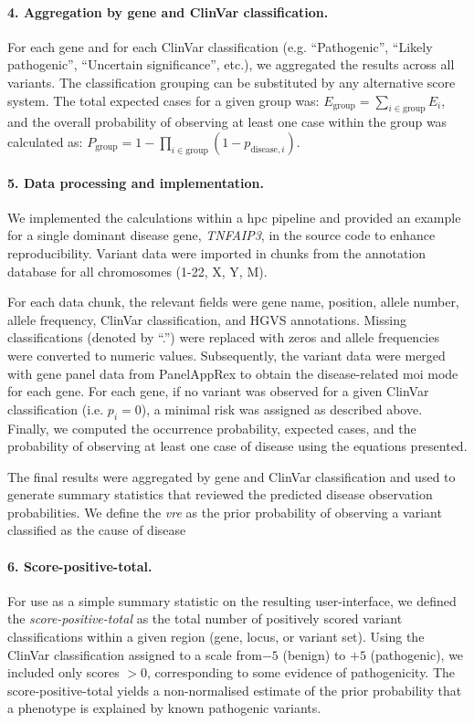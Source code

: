\paragraph{4. Aggregation by gene and ClinVar classification.}
For each gene and for each ClinVar classification (e.g. ``Pathogenic'', ``Likely pathogenic'', ``Uncertain significance'', etc.), we aggregated the results across all variants. The classification grouping can be substituted by any alternative score system. The total expected cases for a given group was:
$E_{\text{group}} = \sum_{i \in \text{group}} E_i$,
and the overall probability of observing at least one case within the group was calculated as:
$P_{\text{group}} = 1 - \prod_{i \in \text{group}} \left(1 - p_{\text{disease},i}\right)$.

\paragraph{5. Data processing and implementation.}
We implemented the calculations within a \ac{hpc} pipeline and provided an example for a single dominant disease gene, \textit{TNFAIP3}, in the source code to enhance reproducibility. Variant data were imported in chunks from the annotation database for all chromosomes (1-22, X, Y, M). 

For each data chunk, the relevant fields were gene name, position, allele number, allele frequency, ClinVar classification, and HGVS annotations. 
Missing classifications (denoted by ``.'') were replaced with zeros and allele frequencies were converted to numeric values. %
Subsequently, the variant data were merged with gene panel data from PanelAppRex to obtain the disease-related \ac{moi} mode for each gene. 
For each gene, if no variant was observed for a given ClinVar classification (i.e. \(p_i = 0\)), a minimal risk was assigned as described above. 
Finally, we computed the occurrence probability, expected cases, and the probability of observing at least one case of disease using the equations presented.

The final results were aggregated by gene and ClinVar classification and used to generate summary statistics that reviewed the predicted disease observation probabilities.
We define the \emph{\ac{vre}} as the prior probability of observing a variant classified as the cause of disease 

\paragraph{6. Score-positive-total.}
For use as a simple summary statistic on the resulting user-interface, we defined the \emph{score-positive-total} as the total number of positively scored variant classifications within a given region (gene, locus, or variant set). 
Using the ClinVar classification assigned to a scale from$-5$ (benign) to $+5$ (pathogenic), we included only scores $> 0$, corresponding to some evidence of pathogenicity. 
The score-positive-total yields a non-normalised estimate of the prior probability that a phenotype is explained by known pathogenic variants.

